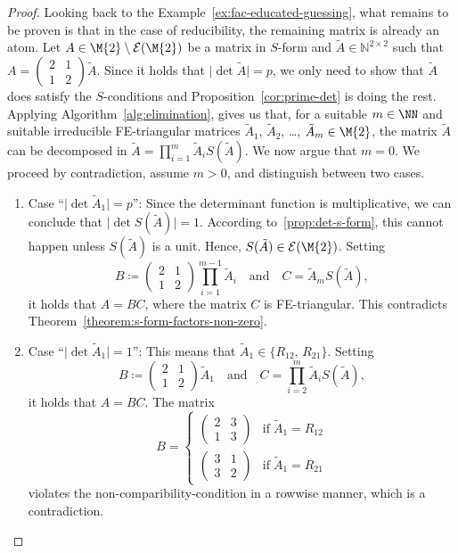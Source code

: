 \begin{proof}
Looking back to the Example~\ref{ex:fac-educated-guessing}, what remains to be proven is that in the case of reducibility, the remaining matrix is already an atom. Let  $A \in \M{2}\setminus\mathcal{E}(\M{2})$ be a matrix in $S$-form and $\tilde{A} \in \mathbb{N}^{2 \times 2}$ such that $A = \begin{pmatrix} 2 & 1 \\ 1 & 2 \end{pmatrix}\tilde{A}$. Since it holds that $\lvert \det{\tilde{A}} \rvert = p$, we only need to show that $\tilde{A}$ does satisfy the $S$-conditions and Proposition~\ref{cor:prime-det} is doing the rest. Applying Algorithm~\ref{alg:elimination}, gives us that, for a suitable $m \in \NN$ and suitable irreducible FE-triangular matrices $\tilde{A}_1$, $\tilde{A}_2$, \dots, $\tilde{A}_m \in \M{2}$, the matrix $\tilde{A}$ can be decomposed in $\tilde{A} = \prod_{i=1}^m \tilde{A}_i S(\tilde{A})$. We now argue that $m=0$. We proceed by contradiction, assume $m>0$, and distinguish between two cases.
\begin{enumerate}[label=(\alph*)]
\item Case ``$ \lvert \det{\tilde{A}_1} \rvert =p$'':  Since the determinant function is multiplicative, we can conclude that $ \lvert \det{S(\tilde{A})} \rvert = 1$. According to~\ref{prop:det-s-form}, this cannot happen unless $S(\tilde{A})$ is a unit. Hence, $S(\tilde{A}) \in \mathcal{E}(\M{2})$. Setting 
\[B \coloneqq \begin{pmatrix} 2 & 1 \\ 1 & 2 \end{pmatrix} \prod_{i=1}^{m-1}\tilde{A}_i \quad \text{and} \quad C = \tilde{A}_m S(\tilde{A}),\] 
it holds that $A = BC$, where the matrix $C$ is FE-triangular. This contradicts Theorem~\ref{theorem:s-form-factors-non-zero}.
\item Case ``$\lvert \det{\tilde{A}_1} \rvert =1$'': This means that $\tilde{A}_1 \in \{ R_{12}, \, R_{21} \}$. Setting 
\[ B \coloneqq \begin{pmatrix} 2 & 1 \\ 1 & 2 \end{pmatrix}\tilde{A}_1 \quad \text{and} \quad C = \prod_{i=2}^m \tilde{A}_i S(\tilde{A}), \]
it holds that $A=BC$. The matrix 
\[ B = \begin{cases} \begin{pmatrix} 2 & 3 \\ 1 & 3 \end{pmatrix} & \text{if}\;\tilde{A}_1 = R_{12} \\ \begin{pmatrix} 3 & 1 \\ 3 & 2 \end{pmatrix} & \text{if}\;\tilde{A}_1 = R_{21} \end{cases} \]
violates the non-comparibility-condition in a rowwise manner, which is a contradiction.
\end{enumerate}
\end{proof}

